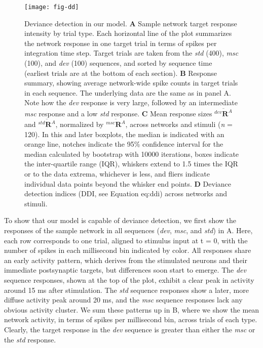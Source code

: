 \documentclass[9pt,lineno,onehalfspacing]{elife}
\newcommand{\dev}{\textit{dev}}
\newcommand{\msc}{\textit{msc}}
\newcommand{\std}{\textit{std}}
\newcommand{\R}[3][]{{}^{#1}_{}\boldsymbol R^{#2}_{#3}}
\newcommand{\mean}[1]{\overline{#1}}
\begin{document}
\begin{figure}
    \texttt{[image: fig-dd]}
    \caption{%
        Deviance detection in our model.
        \textbf{A} Sample network target response intensity by trial type. Each horizontal line of the plot summarizes the network response in one target trial in terms of spikes per integration time step. Target trials are taken from the \std{} (400), \msc{} (100), and \dev{} (100) sequences, and sorted by sequence time (earliest trials are at the bottom of each section).
        \textbf{B} Response summary, showing average network-wide spike counts in target trials in each sequence. The underlying data are the same as in panel A. Note how the \dev{} response is very large, followed by an intermediate \msc{} response and a low \std{} response.
        \textbf{C} Mean response sizes $\mean{\R[dev]{A}{}}$ and $\mean{\R[std]{A}{}}$, normalized by $\mean{\R[msc]{A}{}}$, across networks and stimuli (\textit{n} = 120). In this and later boxplots, the median is indicated with an orange line, notches indicate the 95\% confidence interval for the median calculated by bootstrap with 10000 iterations, boxes indicate the inter-quartile range (IQR), whiskers extend to 1.5 times the IQR or to the data extrema, whichever is less, and fliers indicate individual data points beyond the whisker end points.
        \textbf{D} Deviance detection indices (DDI, see Equation {eq:ddi}) across networks and stimuli.
    }
    \label{fig:DD}
\end{figure}

To show that our model is capable of deviance detection, we first show the responses of the sample network in all sequences (\dev{}, \msc{}, and \std{}) in A. Here, each row corresponds to one trial, aligned to stimulus input at t = 0, with the number of spikes in each millisecond bin indicated by color. All responses share an early activity pattern, which derives from the stimulated neurons and their immediate postsynaptic targets, but differences soon start to emerge. The \dev{} sequence responses, shown at the top of the plot, exhibit a clear peak in activity around 15 ms after stimulation. The \std{} sequence responses show a later, more diffuse activity peak around 20 ms, and the \msc{} sequence responses lack any obvious activity cluster. We sum these patterns up in B, where we show the mean network activity, in terms of spikes per millisecond bin, across trials of each type. Clearly, the target response in the \dev{} sequence is greater than either the \msc{} or the \std{} response.
\end{document}
